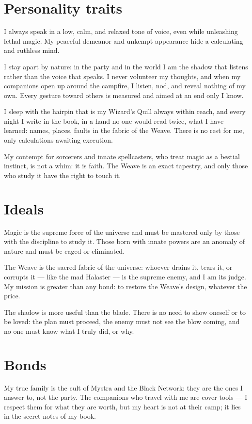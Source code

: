 \documentclass[letterpaper,twocolumn,openany,nodeprecatedcode,justified]{dndbook}
\begin{document}
\section{Personality traits}
I always speak in a low, calm, and relaxed tone of voice, even while
unleashing lethal magic. My peaceful demeanor and unkempt appearance
hide a calculating and ruthless mind.

I stay apart by nature: in the party and in the world I am the shadow
that listens rather than the voice that speaks. I never volunteer my
thoughts, and when my companions open up around the campfire, I listen,
nod, and reveal nothing of my own. Every gesture toward others is
measured and aimed at an end only I know.

I sleep with the hairpin that is my Wizard's Quill always within reach,
and every night I write in the book, in a hand no one would read twice,
what I have learned: names, places, faults in the fabric of the Weave.
There is no rest for me, only calculations awaiting execution.

My contempt for sorcerers and innate spellcasters, who treat magic as a
bestial instinct, is not a whim: it is faith. The Weave is an exact
tapestry, and only those who study it have the right to touch it.

\section{Ideals}
Magic is the supreme force of the universe and must be mastered only by
those with the discipline to study it. Those born with innate powers are
an anomaly of nature and must be caged or eliminated.

The Weave is the sacred fabric of the universe: whoever drains it, tears
it, or corrupts it --- like the mad Halaster --- is the supreme enemy, and
I am its judge. My mission is greater than any bond: to restore the
Weave's design, whatever the price.

The shadow is more useful than the blade. There is no need to show
oneself or to be loved: the plan must proceed, the enemy must not see
the blow coming, and no one must know what I truly did, or why.

\section{Bonds}
My true family is the cult of Mystra and the Black Network: they are the
ones I answer to, not the party. The companions who travel with me are
cover tools --- I respect them for what they are worth, but my heart is
not at their camp; it lies in the secret notes of my book.
\end{document}
